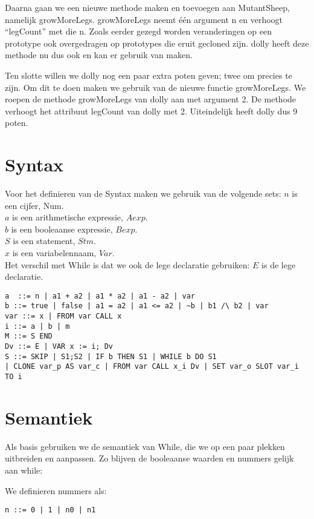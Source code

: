 \documentclass[12pt]{article}
\begin{document}
Daarna gaan we een nieuwe methode maken en toevoegen aan MutantSheep, namelijk growMoreLegs.
growMoreLegs neemt \'e\'en argument n en verhoogt ``legCount'' met die n. Zoals eerder gezegd worden veranderingen op een prototype ook overgedragen op prototypes die eruit gecloned zijn. dolly heeft deze methode nu dus ook en kan er gebruik van maken.\newline

Ten slotte willen we dolly nog een paar extra poten geven; twee om precies te zijn.
Om dit te doen maken we gebruik van de nieuwe functie growMoreLegs.
We roepen de methode growMoreLegs van dolly aan met argument 2.
De methode verhoogt het attribuut legCount van dolly met 2.
Uiteindelijk heeft dolly dus 9 poten.

\pagebreak
\section{Syntax}
Voor het definieren van de Syntax maken we gebruik van de volgende sets:
$n$ is een cijfer, Num. \\
$a$ is een arithmetische expressie, $Aexp$. \\
$b$ is een booleaanse expressie, $Bexp$. \\
$S$ is een statement, $Stm$. \\
$x$ is een variabelennaam, $Var$. \\

Het verschil met While is dat we ook de lege declaratie gebruiken:
$E$ is de lege declaratie.

\begin{lstlisting}
a  ::= n | a1 + a2 | a1 * a2 | a1 - a2 | var
b ::= true | false | a1 = a2 | a1 <= a2 | ~b | b1 /\ b2 | var 
var ::= x | FROM var CALL x
i ::= a | b | m
M ::= S END 
Dv ::= E | VAR x := i; Dv
S ::= SKIP | S1;S2 | IF b THEN S1 | WHILE b DO S1
| CLONE var_p AS var_c | FROM var CALL x_i Dv | SET var_o SLOT var_i TO i
\end{lstlisting}

\pagebreak
\section{Semantiek}

Als basis gebruiken we de semantiek van While, die we op een paar plekken uitbreiden en aanpassen.
Zo blijven de booleaanse waarden en nummers gelijk aan while:

We definieren nummers als:
\begin{lstlisting}
n ::= 0 | 1 | n0 | n1
\end{lstlisting}
\end{document}
